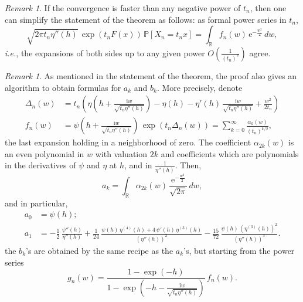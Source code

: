 \documentclass[12pt,a4paper,reqno]{amsart}
\theoremstyle{remark}
\newtheorem{remark}[lemma]{Remark}
\newcommand{\R}{\mathbb{R}}
\newcommand{\E}{\mathrm{e}}
\newcommand{\I}{\mathrm{i}}
\newcommand{\proba}{\mathbb{P}}
\begin{document}
\begin{remark}
If the convergence is faster than any negative power of $t_{n}$, then one can simplify the statement of the theorem as follows: as formal power series in $t_{n}$,
$$ \sqrt{2\pi t_{n}\eta''(h)}\,\exp(t_{n}F(x))\,\proba[X_{n}=t_{n}x]=\int_{\R} f_{n}(w)\,\E^{-\frac{w^{2}}{2}}\,dw,$$
\emph{i.e.}, the expansions of both sides up to any given power $O\!\left(\frac{1}{(t_{n})^{v}}\right)$ agree.
\end{remark}

\begin{remark}\label{rem:computation_ak_bk}
As mentioned in the statement of the theorem, the proof also gives an algorithm to obtain formulas for $a_k$ and $b_k$. More precisely, denote  
\begin{align*}\Delta_{n}(w)&=t_{n}\left(\eta\!\left(h+\frac{\I w}{\sqrt{t_{n}\eta''(h)}}\right)-\eta(h)-\eta'(h)\,\frac{\I w}{\sqrt{t_{n}\eta''(h)}}+\frac{w^{2}}{2t_{n}}\right)\\
f_{n}(w)&=\psi \!\left(h+\frac{\I w}{\sqrt{t_{n}\eta''(h)}}\right)\,\exp(t_n \Delta_{n}(w))=\sum_{k=0}^{\infty} \frac{\alpha_{k}(w)}{(t_{n})^{k/2}},
\end{align*}
the last expansion holding in a neighborhood of zero. The coefficient $\alpha_{2k}(w)$ is an even polynomial in $w$ with valuation $2k$ and coefficients which are polynomials in the derivatives of $\psi$ and $\eta$ at $h$, and in $\frac{1}{\eta''(h)}$. Then, 
$$a_{k}=\int_{\R}\alpha_{2k}(w) \,\frac{\E^{-\frac{w^{2}}{2}}}{\sqrt{2\pi}}\,dw,$$
and in particular,
\begin{align*}
a_{0}&= \psi(h);\\ 
a_{1}&= -\frac{1}{2}\,\frac{\psi''(h)}{\eta''(h)}+\frac{1}{24}\,\frac{\psi(h)\,\eta^{(4)}(h)+4\,\psi'(h)\,\eta^{(3)}(h)}{(\eta''(h))^{2}}-\frac{15}{72}\,\frac{\psi(h)\,(\eta^{(3)}(h))^{2}}{(\eta''(h))^{3}}.
\end{align*}
the $b_{k}$'s are obtained by the same recipe as the $a_{k}$'s, but starting from the power series
$$g_{n}(w)=\frac{1-\exp(-h)}{1-\exp\!\left(-h- \frac{\I w}{\sqrt{t_{n}\eta''(h)}}\right)}\,f_{n}(w).$$
\end{remark}
\medskip
\end{document}
